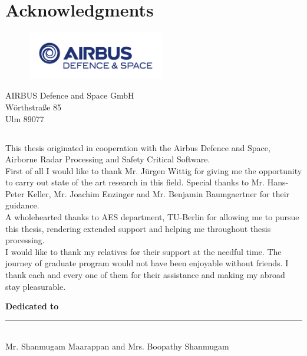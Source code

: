 \chapter*{Acknowledgments}
\label{chap:ack}

\begin{center}

	\begin{figure}[h!]
	\centering
	\includegraphics[width=60mm]{figures/AIRBUS_DS_Flat_RGB}
	\end{figure}
	
	AIRBUS Defence and Space GmbH\\
	W{\"o}rthstra{\ss}e 85 \\
	Ulm 89077 \\

\end{center}

\section*{}
This thesis originated in cooperation with the Airbus Defence and Space, Airborne Radar Processing and Safety Critical Software. \\

First of all I would like to thank Mr. J{\"u}rgen Wittig for giving me the opportunity to carry out state of the art research in this field. Special thanks to Mr. Hans-Peter Keller, Mr. Joachim Enzinger and Mr. Benjamin Baumgaertner for their guidance. \\

A wholehearted thanks to AES department, TU-Berlin for allowing me to pursue this thesis, rendering extended support and helping me throughout thesis processing. \\

I would like to thank my relatives for their support at the needful time. The journey of graduate program would not have been enjoyable without friends. I thank each and every one of them for their assistance and making my abroad stay pleasurable.

\clearpage
\textbf{\LARGE{Dedicated to}} \\
\rule{\textwidth}{1pt}
~\\
Mr. Shanmugam Maarappan and Mrs. Boopathy Shanmugam